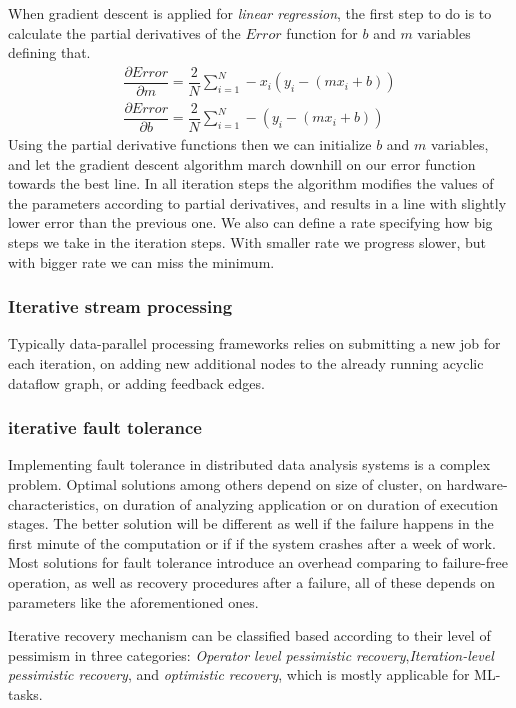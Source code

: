 When gradient descent is applied for \textit{linear regression}, the first step to do is to calculate the partial derivatives of the $Error$ function for  $b$ and $m$ variables defining that.
\begin{align}
\dfrac{\partial Error}{\partial m} = \dfrac{2}{N}\sum_{i=1}^{N} -x_i(y_i-(mx_i+b)) \\
\dfrac{\partial Error}{\partial b} = \dfrac{2}{N}\sum_{i=1}^{N} -(y_i-(mx_i+b))
\end{align}
Using the partial derivative functions then we can initialize $b$ and $m$ variables, and let the gradient descent  algorithm march downhill on our error function towards the best line. In all iteration steps the algorithm modifies the values of the parameters according to partial derivatives, and results in a line with slightly lower error than the previous one. We also can define a rate specifying how big steps we take in the iteration steps. With smaller rate we progress slower, but with bigger rate we can miss the minimum. 
\cite{gradientdescent}%
\subsubsection{Iterative stream processing}
Typically data-parallel processing frameworks relies on  submitting a new job for each iteration, on adding new additional nodes to the already running acyclic dataflow graph, or adding feedback edges. 
\subsubsection{iterative fault tolerance}
Implementing fault tolerance in distributed data analysis systems is a complex problem. Optimal solutions\cite{allroadsleadtorome} among others depend on size of cluster, on hardware-characteristics, on duration of analyzing application or on duration of execution stages. The better solution will be different  as well if the failure happens in the first minute of the computation or if if the system crashes after a week of work.
Most solutions for fault tolerance introduce an overhead comparing to failure-free operation, as well as recovery procedures after a failure, all of these depends on parameters like the aforementioned ones.

Iterative recovery mechanism can be classified based according to their level of pessimism in three categories\cite{allroadsleadtorome}: \textit{Operator level pessimistic recovery},\textit{Iteration-level pessimistic recovery}, and \textit{optimistic recovery}, which is mostly applicable for ML-tasks. 

